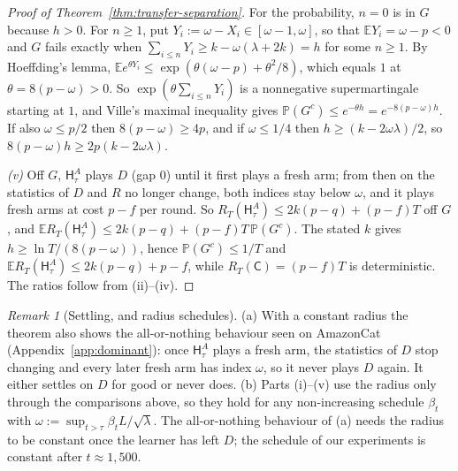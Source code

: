 \documentclass{article}
\theoremstyle{definition}
\theoremstyle{remark}
\newtheorem{remark}{Remark}
\newcommand{\Prb}{\mathbb{P}}
\newcommand{\E}{\mathbb{E}}
\theoremstyle{remark}
\newcommand{\Cold}{\mathsf{C}}
\newcommand{\Hyb}{\mathsf{H}}
\begin{document}
\begin{proof}[Proof of Theorem~\ref{thm:transfer-separation}]
For the probability, $n=0$ is in $G$ because $h>0$. For $n\ge1$, put
$Y_i:=\omega-X_i\in[\omega-1,\omega]$, so that $\E Y_i=\omega-p<0$ and $G$ fails exactly when
$\sum_{i\le n}Y_i\ge k-\omega(\lambda+2k)=h$ for some $n\ge1$. By Hoeffding's lemma,
$\E e^{\theta Y_i}\le\exp(\theta(\omega-p)+\theta^2/8)$, which equals $1$ at
$\theta=8(p-\omega)>0$. So $\exp(\theta\sum_{i\le n}Y_i)$ is a nonnegative
supermartingale starting at $1$, and Ville's maximal inequality gives
$\Prb(G^c)\le e^{-\theta h}=e^{-8(p-\omega)h}$. If also $\omega\le p/2$ then
$8(p-\omega)\ge4p$, and if $\omega\le1/4$ then $h\ge(k-2\omega\lambda)/2$, so
$8(p-\omega)h\ge2p(k-2\omega\lambda)$.

\emph{(v)} Off $G$, $\Hyb^A_\tau$ plays $D$ (gap $0$) until it first plays a
fresh arm; from then on the statistics of $D$ and $R$ no longer change, both
indices stay below $\omega$, and it plays fresh arms at cost $p-f$ per round.
So $R_T(\Hyb^A_\tau)\le2k(p-q)+(p-f)T$ off $G$, and
$\E R_T(\Hyb^A_\tau)\le2k(p-q)+(p-f)T\,\Prb(G^c)$. The stated $k$ gives
$h\ge\ln T/(8(p-\omega))$, hence $\Prb(G^c)\le1/T$ and
$\E R_T(\Hyb^A_\tau)\le2k(p-q)+p-f$, while $R_T(\Cold)=(p-f)T$ is
deterministic. The ratios follow from (ii)--(iv).
\end{proof}

\begin{remark}[Settling, and radius schedules]
\label{rem:transfer-extensions}
(a) With a constant radius the theorem also shows the all-or-nothing
behaviour seen on AmazonCat (Appendix~\ref{app:dominant}): once
$\Hyb^A_\tau$ plays a fresh arm, the statistics of $D$ stop changing and every
later fresh arm has index $\omega$, so it never plays $D$ again. It either
settles on $D$ for good or never does.
(b) Parts (i)--(v) use the radius only through the comparisons above, so they
hold for any non-increasing schedule $\beta_t$ with
$\omega:=\sup_{t>\tau}\beta_tL/\sqrt\lambda$. The all-or-nothing behaviour of
(a) needs the radius to be constant once the learner has left $D$; the
schedule of our experiments is constant after $t\approx1{,}500$.
\end{remark}
\end{document}
